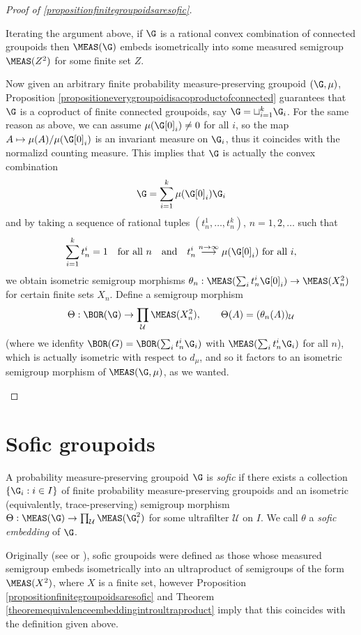 \begin{proof}[Proof of \ref{propositionfinitegroupoidsaresofic}]
\begin{enumerate}
Iterating the argument above, if $\G$ is a rational convex combination of connected groupoids then $\MEAS(\G)$ embeds isometrically into some measured semigroup $\MEAS(Z^2)$ for some finite set $Z$.

Now given an arbitrary finite probability measure-preserving groupoid $(\G,\mu)$, Proposition \ref{propositioneverygroupoidisacoproductofconnected} guarantees that $\G$ is a coproduct of finite connected groupoids, say $\G=\sqcup_{i=1}^k \G_i$. For the same reason as above, we can assume $\mu(\G[0]_i)\neq 0$ for all $i$, so the map $A\mapsto \mu(A)/\mu(\G[0]_i)$ is an invariant measure on $\G_i$, thus it coincides with the normalizd counting measure. This implies that $\G$ is actually the convex combination
\[\G=\sum_{i=1}^k \mu(\G[0]_i)\G_i\]
and by taking a sequence of rational tuples $(t^1_n,\ldots,t^k_n)$, $n=1,2,\ldots$ such that
\[\sum_{i=1}^k t_n^i=1\quad\text{for all }n\quad\text{and}\quad t^i_n\overset{n\to\infty}{\longrightarrow}\mu(\G[0]_i)\text{ for all }i,\]
we obtain isometric semigroup morphisms $\theta_n:\MEAS(\sum_i t^i_n\G[0]_i)\to\MEAS(X_n^2)$ for certain finite sets $X_n$. Define a semigroup morphism
\[\Theta:\BOR(\G)\to\prod_\mathcal{U}\MEAS(X_n^2),\qquad \Theta(A)=(\theta_n(A))_\mathcal{U}\]
(where we idenfity $\BOR(G)=\BOR(\sum_i t^i_n\G_i)$ with $\MEAS(\sum_i t^i_n\G_i)$ for all $n$), which is actually isometric with respect to $d_\mu$, and so it factors to an isometric semigroup morphism of $\MEAS(\G,\mu)$, as we wanted.\qedhere
\end{enumerate}
\end{proof}

\section{Sofic groupoids}

\begin{definition}
A probability measure-preserving groupoid $\G$ is \emph{sofic} if there {exists} a collection $\left\{\G_i:i\in I\right\}$ of finite probability measure-preserving groupoids and an isometric (equivalently, trace-preserving) semigroup morphism $\Theta:\MEAS(\G)\to\prod_{\mathcal{U}}\MEAS(\G_i^2)$ for some ultrafilter $\mathcal{U}$ on $I$. We call $\theta$ a \emph{sofic embedding} of $\G$.
\end{definition}

Originally (see \cite{ozawasoficnotes} or \cite{MR3035288}), sofic groupoids were defined as those whose measured semigroup embeds isometrically into an ultraproduct of semigroups of the form $\MEAS(X^2)$, where $X$ is a finite set, however Proposition \ref{propositionfinitegroupoidsaresofic} and Theorem \ref{theoremequivalenceembeddingintroultraproduct} imply that this coincides with the definition given above.

